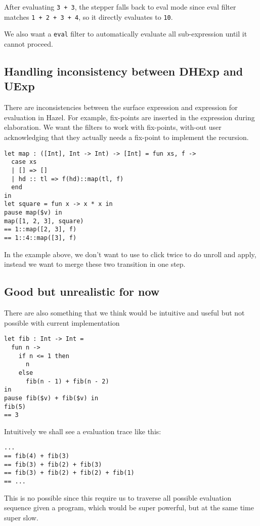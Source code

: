 After evaluating \verb|3 + 3|, the stepper falls back to eval mode
since eval filter matches \verb|1 + 2 + 3 + 4|, so it directly
evaluates to \verb|10|.

We also want a \verb|eval| filter to automatically evaluate all sub-expression
until it cannot proceed.

\subsection{Handling inconsistency between DHExp and UExp}


There are inconsistencies between the surface expression and expression for
evaluation in Hazel. For example, fix-points are inserted in the expression
during elaboration. We want the filters to work with fix-points, with-out user
acknowledging that they actually needs a fix-point to implement the recursion.

\begin{verbatim}
let map : ([Int], Int -> Int) -> [Int] = fun xs, f ->
  case xs
  | [] => []
  | hd :: tl => f(hd)::map(tl, f)
  end
in
let square = fun x -> x * x in
pause map($v) in
map([1, 2, 3], square)
== 1::map([2, 3], f)
== 1::4::map([3], f)
\end{verbatim}

In the example above, we don't want to use to click twice to do unroll and apply, instead we want to merge these two transition
in one step.

\subsection{Good but unrealistic for now}


There are also something that we think would be intuitive and useful but not possible with current implementation

\begin{verbatim}
let fib : Int -> Int =
  fun n ->
    if n <= 1 then
      n
    else
      fib(n - 1) + fib(n - 2)
in
pause fib($v) + fib($v) in
fib(5)
== 3
\end{verbatim}

Intuitively we shall see a evaluation trace like this:
\begin{verbatim}
...
== fib(4) + fib(3)
== fib(3) + fib(2) + fib(3)
== fib(3) + fib(2) + fib(2) + fib(1)
== ...
\end{verbatim}

This is no possible since this require us to traverse all possible
evaluation sequence given a program, which would be super powerful,
but at the same time super slow.

